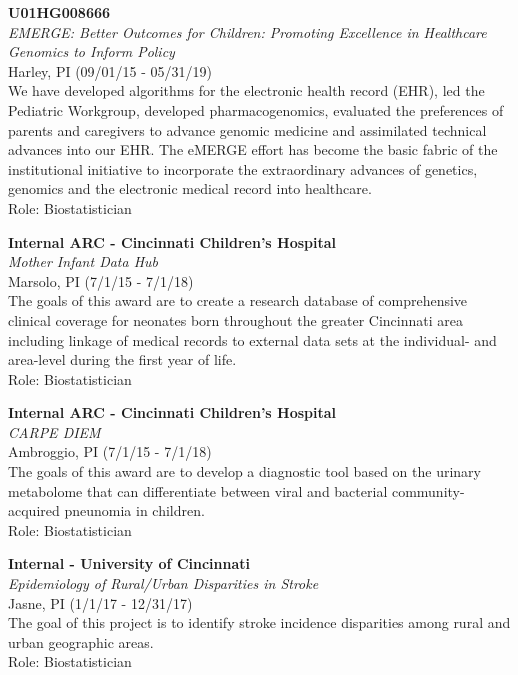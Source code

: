 \documentclass{nihbiosketch}
\begin{document}
\bigskip

\textbf{U01HG008666}\\
\emph{EMERGE: Better Outcomes for Children: Promoting Excellence in
	Healthcare Genomics to Inform Policy}\\
Harley, PI (09/01/15 - 05/31/19)\\
We have developed algorithms for the electronic health record (EHR), led
the Pediatric Workgroup, developed pharmacogenomics, evaluated the
preferences of parents and caregivers to advance genomic medicine and
assimilated technical advances into our EHR. The eMERGE effort has
become the basic fabric of the institutional initiative to incorporate
the extraordinary advances of genetics, genomics and the electronic
medical record into healthcare.\\
Role: Biostatistician

\bigskip

\textbf{Internal ARC - Cincinnati Children's Hospital}\\
\emph{Mother Infant Data Hub}\\
Marsolo, PI (7/1/15 - 7/1/18)\\
The goals of this award are to create a research database of
comprehensive clinical coverage for neonates born throughout the greater
Cincinnati area including linkage of medical records to external data
sets at the individual- and area-level during the first year of life.\\
Role: Biostatistician

\bigskip

\textbf{Internal ARC - Cincinnati Children's Hospital}\\
\emph{CARPE DIEM}\\
Ambroggio, PI (7/1/15 - 7/1/18)\\
The goals of this award are to develop a diagnostic tool based on the
urinary metabolome that can differentiate between viral and bacterial
community-acquired pneunomia in children.\\
Role: Biostatistician

\bigskip

\textbf{Internal - University of Cincinnati}\\
\emph{Epidemiology of Rural/Urban Disparities in Stroke}\\
Jasne, PI (1/1/17 - 12/31/17)\\
The goal of this project is to identify stroke incidence disparities
among rural and urban geographic areas.\\
Role: Biostatistician
\end{document}
